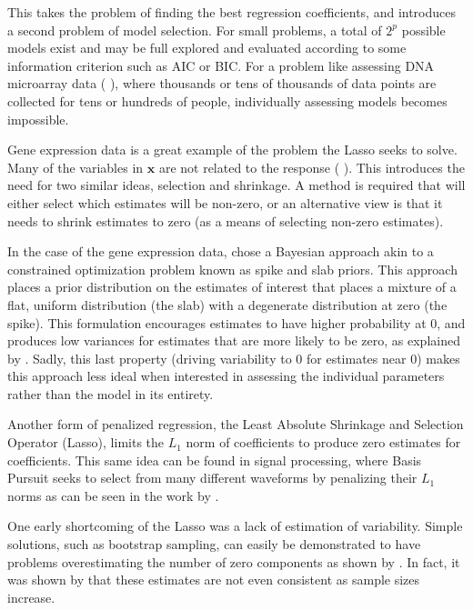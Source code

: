 \documentclass{uwstat572}
\newcommand{\vmcomment}[1]{({\color{blue}{VM's comment:}} \textbf{\color{blue}{#1}})}
\begin{document}
This takes the problem of finding the best regression coefficients, and introduces a second problem of model selection. For small problems, a total of $2^p$ possible models exist and may be full explored and evaluated according to some information criterion such as AIC or BIC. For a problem like assessing DNA microarray data \vmcomment{Not sure what ``assessing ... data'' means; also, you refer to microarray data as if everyone should be familiar with it.}, where thousands or tens of thousands of data points are collected for tens or hundreds of people, individually assessing models becomes impossible.

Gene expression data is a great example of the problem the Lasso seeks to solve. Many of the variables in $\mathbf{x}$ are not related to the response \vmcomment{Give an example of a response.}. This introduces the need for two similar ideas, selection and shrinkage. A method is required that will either select which estimates will be non-zero, or an alternative view is that it needs to shrink estimates to zero (as a means of selecting non-zero estimates). 

In the case of the gene expression data, \cite{ishwaran2005spike} chose a Bayesian approach akin to a constrained optimization problem known as spike and slab priors. This approach places a prior distribution on the estimates of interest that places a mixture of a flat, uniform distribution (the slab) with a degenerate distribution at zero (the spike). This formulation encourages estimates to have higher probability at 0, and produces low variances for estimates that are more likely to be zero, as explained by \cite{ishwaran2005spike2}. Sadly, this last property (driving variability to 0 for estimates near 0) makes this approach less ideal when interested in assessing the individual parameters rather than the model in its entirety.

Another form of penalized regression, the Least Absolute Shrinkage and Selection Operator (Lasso), limits the $L_1$ norm of coefficients to produce zero estimates for coefficients. This same idea can be found in signal processing, where Basis Pursuit seeks to select from many different waveforms by penalizing their $L_1$ norms as can be seen in the work by \cite{chen2001atomic}.

One early shortcoming of the Lasso was a lack of estimation of variability. Simple solutions, such as bootstrap sampling, can easily be demonstrated to have problems overestimating the number of zero components as shown by \cite{kyung2010penalized}. In fact, it was shown by \cite{shao1996bootstrap} that these estimates are not even consistent as sample sizes increase. 
\end{document}
